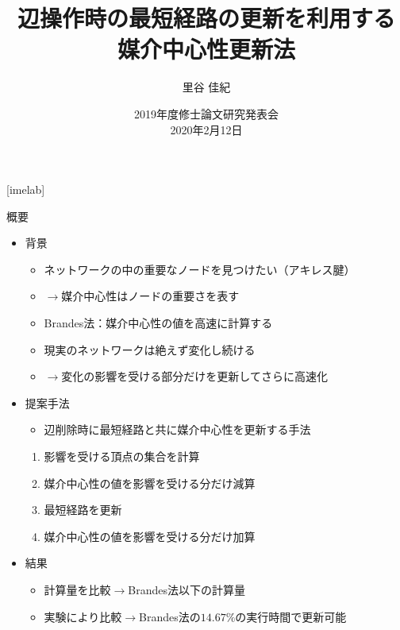 \documentclass[dvipdfmx,fleqn]{beamer}
\title[媒介中心性更新法]{辺操作時の最短経路の更新を利用する \\ 媒介中心性更新法}
\author[里谷]{里谷 佳紀}
\institute[情数工研]{情報数理工学研究室}
\date[研究発表会]{2019年度修士論文研究発表会 \\ 2020年2月12日}
\begin{document}
{
  [imelab]
  \begin{frame}
    \titlepage
  \end{frame}
}

\begin{frame}{概要}
  \begin{itemize}
  \item 背景
    \begin{itemize}
    \item ネットワークの中の重要なノードを見つけたい（アキレス腱）
    \item[] $\rightarrow$\alert{媒介中心性}はノードの重要さを表す
    \item Brandes法：媒介中心性の値を高速に計算する
    \item 現実のネットワークは\alert{絶えず変化し続ける}
    \item[] $\rightarrow$変化の影響を受ける部分だけを更新してさらに高速化
    \end{itemize}
  \item 提案手法
    \begin{itemize}
    \item 辺削除時に最短経路と共に媒介中心性を更新する手法
    \end{itemize}
    \begin{enumerate}
    \item 影響を受ける頂点の集合を計算
    \item 媒介中心性の値を影響を受ける分だけ\alert{減算}
    \item \alert{最短経路を更新}
    \item 媒介中心性の値を影響を受ける分だけ\alert{加算}
    \end{enumerate}
  \item 結果
    \begin{itemize}
    \item 計算量を比較$\rightarrow$Brandes法以下の計算量
    \item 実験により比較$\rightarrow$Brandes法の$14.67\%$の実行時間で更新可能
    \end{itemize}
  \end{itemize}
\end{frame}
\end{document}
